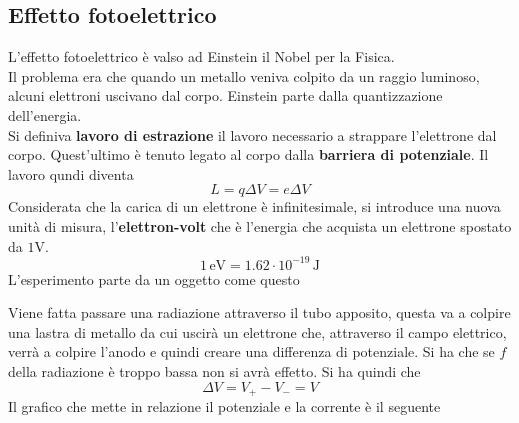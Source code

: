 \subsection{Effetto fotoelettrico}
L'effetto fotoelettrico è valso ad Einstein il Nobel per la Fisica.\\
Il problema era che quando un metallo veniva colpito da un raggio luminoso, alcuni elettroni uscivano
dal corpo. Einstein parte dalla quantizzazione dell'energia.\\
Si definiva \textbf{lavoro di estrazione} il lavoro necessario a strappare l'elettrone dal corpo. 
Quest'ultimo è tenuto legato al corpo dalla \textbf{barriera di potenziale}. Il lavoro qundi diventa
\begin{equation*}
  L = q\Delta V = e\Delta V
\end{equation*}
Considerata che la carica di un elettrone è infinitesimale, si introduce una nuova unità di misura,
l'\textbf{elettron-volt} che è l'energia che acquista un elettrone spostato da $1$V.
\begin{equation*}
  1\,\text{eV} = 1.62\cdot10^{-19}\,\text{J}
\end{equation*}
L'esperimento parte da un oggetto come questo
\begin{center}
\end{center}
Viene fatta passare una radiazione attraverso il tubo apposito, questa va a colpire una lastra di
metallo da cui uscirà un elettrone che, attraverso il campo elettrico, verrà a colpire l'anodo e 
quindi creare una differenza di potenziale. Si ha che se $f$ della radiazione è troppo bassa non si 
avrà effetto. Si ha quindi che
\begin{equation*}
  \Delta V = V_+-V_- = V
\end{equation*}
Il grafico che mette in relazione il potenziale e la corrente è il seguente
